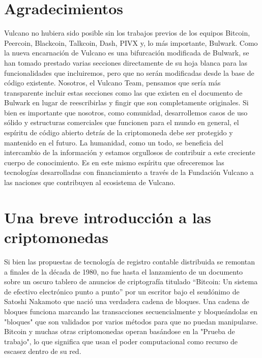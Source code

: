 \documentclass[A4paper, 12pt]{article}
\begin{document}
\section{Agradecimientos}
Vulcano no hubiera sido posible sin los trabajos previos de los equipos Bitcoin, Peercoin, Blackcoin, Talkcoin, Dash, PIVX y, lo más importante, Bulwark. Como la nueva encarnación de Vulcano es una bifurcación modificada de Bulwark, se han tomado prestado varias secciones directamente de su hoja blanca para las funcionalidades que incluiremos, pero que no serán modificadas desde la base de código existente. Nosotros, el Vulcano Team, pensamos que sería más transparente incluir estas secciones como las que existen en el documento de Bulwark en lugar de reescribirlas y fingir que son completamente originales. Si bien es importante que nosotros, como comunidad, desarrollemos casos de uso sólido y estructuras comerciales que funcionen para el mundo en general, el espíritu de código abierto detrás de la criptomoneda debe ser protegido y mantenido en el futuro. La humanidad, como un todo, se beneficia del intercambio de la información y estamos orgullosos de contribuir a este creciente cuerpo de conocimiento. Es en este mismo espíritu que ofreceremos las tecnologías desarrolladas con financiamiento a través de la Fundación Vulcano a las naciones que contribuyen al ecosistema de Vulcano.

\section{Una breve introducción a las criptomonedas}
Si bien las propuestas de tecnología de registro contable distribuida se remontan a finales de la década de 1980, no fue hasta el lanzamiento de un documento sobre un oscuro tablero de anuncios de criptografía titulado “Bitcoin: Un sistema de efectivo electrónico punto a punto” por un escritor bajo el seudónimo de Satoshi Nakamoto que nació una verdadera cadena de bloques. Una cadena de bloques funciona marcando las transacciones secuencialmente y bloqueándolas en "bloques" que son validados por varios métodos para que no puedan manipularse.   Bitcoin y muchas otras criptomonedas operan basándose en la "Prueba de trabajo", lo que significa que usan el poder computacional como recurso de escasez dentro de su red.
\end{document}
